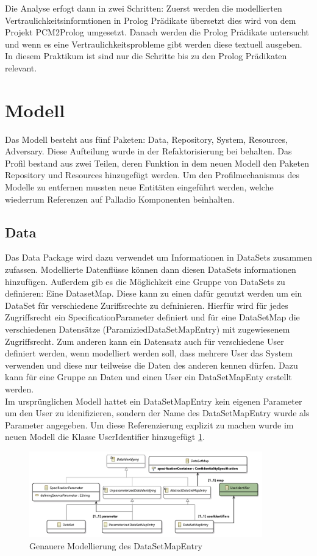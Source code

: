 \documentclass[twoside, ngerman]{sdqseminar}
\begin{document}
Die Analyse erfogt dann in zwei Schritten: Zuerst werden die modellierten Vertraulichkeitsinformtionen in Prolog Prädikate übersetzt dies wird von dem Projekt PCM2Prolog umgesetzt. Danach werden die Prolog Prädikate untersucht und wenn es eine Vertraulichkeitsprobleme gibt werden diese textuell ausgeben. In diesem Praktikum ist sind nur die Schritte bis zu den Prolog Prädikaten relevant.

\section{Modell}
Das Modell besteht aus fünf Paketen: Data, Repository, System, Resources, Adversary. Diese Aufteilung wurde in der Refaktorisierung bei behalten. Das Profil bestand aus zwei Teilen, deren Funktion in dem neuen Modell den Paketen Repository und Resources hinzugefügt werden. Um den Profilmechanismus des Modelle zu entfernen mussten neue Entitäten eingeführt werden, welche wiederrum Referenzen auf Palladio Komponenten beinhalten. 
\subsection{Data}
Das Data Package wird dazu verwendet um Informationen in DataSets zusammen zufassen. Modellierte Datenflüsse können dann diesen DataSets informationen hinzufügen. Außerdem gib es die Möglichkeit eine Gruppe von DataSets zu definieren: Eine DatasetMap. Diese kann zu einen dafür genutzt werden um ein DataSet für verschiedene Zuriffsrechte zu defninieren. Hierfür wird für jedes Zugriffsrecht ein SpecificationParameter definiert und für eine DataSetMap die verschiedenen Datensätze (ParamiziedDataSetMapEntry) mit zugewiesenem Zugriffsrecht. Zum anderen kann ein Datensatz auch für verschiedene User definiert werden, wenn modelliert werden soll, dass mehrere User das System verwenden und diese nur teilweise die Daten des anderen kennen dürfen. Dazu kann für eine Gruppe an Daten und einen User ein DataSetMapEnty erstellt werden. \\
Im ursprünglichen Modell hattet ein DataSetMapEntry kein eigenen Parameter um den User zu idenifizieren, sondern der Name des DataSetMapEntry wurde als Parameter angegeben. Um diese Referenzierung explizit zu machen wurde im neuen Modell die Klasse UserIdentifier hinzugefügt \ref{dataPackage}.

\begin{figure}[htbp]
	\label{dataPackage}
	\centering
	\includegraphics[width=0.9\textwidth]{images/new/data.pdf}
	\caption{Genauere Modellierung des DataSetMapEntry}
\end{figure}
\end{document}
